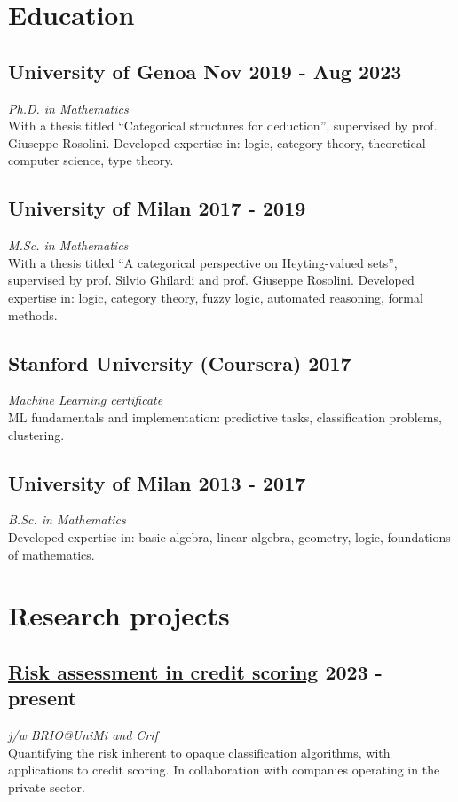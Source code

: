 \documentclass[a4paper,9pt]{article}
\begin{document}
\section*{ Education}

\subsection*{University of Genoa \hfill Nov 2019 - Aug 2023}
\textit{Ph.D. in Mathematics}\\
With a thesis titled ``Categorical structures for deduction'', supervised by prof. Giuseppe Rosolini. Developed expertise in: logic, category theory, theoretical computer science, type theory.

\subsection*{University of Milan \hfill 2017 - 2019}
\textit{M.Sc. in Mathematics}\\
With a thesis titled ``A categorical perspective on Heyting-valued sets'', supervised by prof. Silvio Ghilardi and prof. Giuseppe Rosolini. Developed expertise in: logic, category theory, fuzzy logic, automated reasoning, formal methods.

\subsection*{Stanford University (Coursera) \hfill 2017}
\textit{Machine Learning certificate}\\
ML fundamentals and implementation: predictive tasks, classification problems, clustering.

\subsection*{University of Milan \hfill 2013 - 2017}
\textit{B.Sc. in Mathematics}\\
Developed expertise in: basic algebra, linear algebra, geometry, logic, foundations of mathematics.

\section*{ Research projects}
\subsection*{\href{https://arxiv.org/abs/2406.03292}{Risk assessment in credit scoring} \hfill 2023 - present}
\textit{j/w BRIO@UniMi and Crif}\\
Quantifying the risk inherent to opaque classification algorithms, with applications to credit scoring. In collaboration with companies operating in the private sector.
\end{document}
